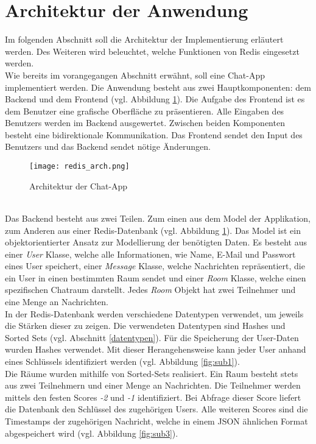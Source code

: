 
\section{Architektur der Anwendung}
Im folgenden Abschnitt soll die Architektur der Implementierung erläutert werden. Des Weiteren wird beleuchtet, welche Funktionen von \acs{Redis} eingesetzt werden.
\\Wie bereits im vorangegangen Abschnitt erwähnt, soll eine Chat-App implementiert werden. Die Anwendung besteht aus zwei Hauptkomponenten: dem Backend und dem Frontend (vgl. Abbildung \ref{fig:arch}). Die Aufgabe des Frontend ist es dem Benutzer eine grafische Oberfläche zu präsentieren. Alle Eingaben des Benutzers werden im Backend ausgewertet. Zwischen beiden Komponenten besteht eine bidirektionale Kommunikation. Das Frontend sendet den Input des Benutzers und das Backend sendet nötige Änderungen.
\begin{figure}[h]
	\centering
	\texttt{[image: redis\_arch.png]}
	\caption{Architektur der Chat-App}
	\label{fig:arch}
\end{figure}
\\Das Backend besteht aus zwei Teilen. Zum einen aus dem Model der Applikation, zum Anderen aus einer \acs{Redis}-Datenbank (vgl. Abbildung \ref{fig:arch}). Das Model ist ein objektorientierter Ansatz zur Modellierung der benötigten Daten. Es besteht aus einer \textit{User} Klasse, welche alle Informationen, wie Name, E-Mail und Passwort eines User speichert, einer \textit{Message} Klasse, welche Nachrichten repräsentiert, die ein User in einen bestimmten Raum sendet und einer \textit{Room} Klasse, welche einen spezifischen Chatraum darstellt. Jedes \textit{Room} Objekt hat zwei Teilnehmer und eine Menge an Nachrichten.
\\In der \acs{Redis}-Datenbank werden verschiedene Datentypen verwendet, um jeweils die Stärken dieser zu zeigen. Die verwendeten Datentypen sind Hashes und Sorted Sets (vgl. Abschnitt \ref{datentypen}). Für die Speicherung der User-Daten wurden Hashes verwendet. Mit dieser Herangehensweise kann jeder User anhand eines Schlüssels identifiziert werden (vgl. Abbildung \ref{fig:sub1}). 
\\Die Räume wurden mithilfe von Sorted-Sets realisiert. Ein Raum besteht stets aus zwei Teilnehmern und einer Menge an Nachrichten. Die Teilnehmer werden mittels den festen Scores \textit{-2} und \textit{-1} identifiziert. Bei Abfrage dieser Score liefert die Datenbank den Schlüssel des zugehörigen Users. Alle weiteren Scores sind die Timestamps der zugehörigen Nachricht, welche in einem JSON ähnlichen Format abgespeichert wird (vgl. Abbildung \ref{fig:sub3}).
